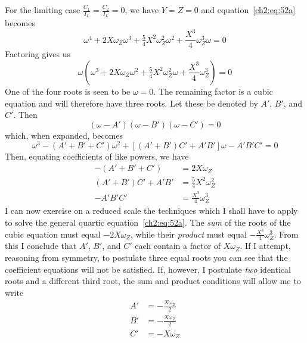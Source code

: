 For the limiting case $\frac{C_1}{I_L} = \frac{C_2}{I_L} = 0$, we have
$Y = Z = 0$ and equation~\eqref{ch2:eq:52a} becomes
\begin{equation*}
\omega^4 + 2X\omega_Z\omega^3 + \tfrac{5}{4}X^2\omega_Z^2\omega^2
  + \frac{X^3}{4}\omega_Z^3\omega = 0
\end{equation*}
Factoring gives us
\begin{equation*}
\omega\left(\omega^3 + 2X\omega_Z\omega^2 + \tfrac{5}{4}X^2\omega_Z^2\omega
  + \frac{X^3}{4}\omega_Z^3\right) = 0
\end{equation*}
One of the four roots is seen to be $\omega = 0$. The remaining factor is a
cubic equation and will therefore have three roots. Let these be denoted by
$A'$, $B'$, and $C'$. Then
\begin{equation*}
(\omega - A')(\omega - B')(\omega - C') = 0
\end{equation*}
which, when expanded, becomes
\begin{equation*}
\omega^3 - (A' + B' + C')\omega^2 + \left[(A' + B')C' + A'B'\right]\omega
  - A'B'C' = 0
\end{equation*}
Then, equating coefficients of like powers, we have
\begin{align*}
-(A' + B' + C') &= 2X\omega_Z\\
(A' + B')C' + A'B' &= \tfrac{5}{4}X^2\omega_Z^2\\
-A'B'C' &= \frac{X^3}{4}\omega_Z^3
\end{align*}
I can now exercise on a reduced scale the techniques which I shall have to
apply to solve the general quartic equation~\eqref{ch2:eq:52a}. The
\emph{sum} of the roots of the cubic equation must equal $-2X\omega_Z$, while
their \emph{product} must equal $-\frac{X^3}{4}\omega_Z^3$. From this I
conclude that $A'$, $B'$, and $C'$ each contain a factor of $X\omega_Z$. If I
attempt, reasoning from symmetry, to postulate three equal roots you can see
that the coefficient equations will not be satisfied. If, however, I postulate
\emph{two} identical roots and a different third root, the sum and product
conditions will allow me to write
\begin{align*}
A' &= -\frac{X\omega_Z}{2}\\
B' &= -\frac{X\omega_Z}{2}\\
C' &= -X\omega_Z
\end{align*}
